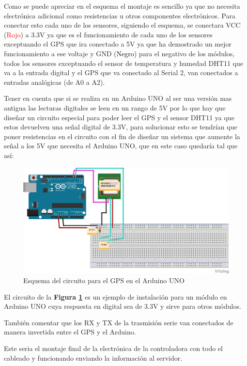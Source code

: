 Como se puede apreciar en el esquema el montaje es sencillo ya que no necesita electrónica adicional como resistencias u otros componentes electrónicos. Para conectar esto cada uno de los sensores, siguiendo el esquema, se conectara VCC (\textcolor{red}{Rojo}) a 3.3V ya que es el funcionamiento de cada uno de los sensores exceptuando el GPS que ira conectado a 5V ya que ha demostrado un mejor funcionamiento a ese voltaje y GND (\textcolor{black}{Negro}) para el negativo de los módulos, todos los sensores exceptuando el sensor de temperatura y humedad DHT11 que va a la entrada digital y el GPS que va conectado al Serial 2, van conectados a entradas analógicas (de A0 a A2).

Tener en cuenta que si se realiza en un Arduino UNO al ser una versión mas antigua las lecturas digitales se leen en un rango de 5V por lo que hay que diseñar un circuito especial para poder leer el GPS y el sensor DHT11 ya que estos devuelven una señal digital de 3.3V, para solucionar esto se tendrían que poner resistencias en el circuito con el fin de diseñar un sistema que aumente la señal a los 5V que necesita el Arduino UNO, que en este caso quedaría tal que así:

\begin{figure}[!h]
	\centering
	\includegraphics[width=0.9\linewidth]{figuras/unogps}
	\caption{Esquema del circuito para el GPS en el Arduino UNO}
	\label{fig:imgunogps}
\end{figure}

El circuito de la \textbf{Figura \ref{fig:imgunogps}} es un ejemplo de instalación para un módulo en Arduino UNO cuya respuesta en digital sea de 3.3V y sirve para otros módulos.

También comentar que los RX y TX de la trasmisión serie van conectados de manera invertida entre el GPS y el Arduino.

Este seria el montaje final de la electrónica de la controladora con todo el cableado y funcionando enviando la información al servidor.

